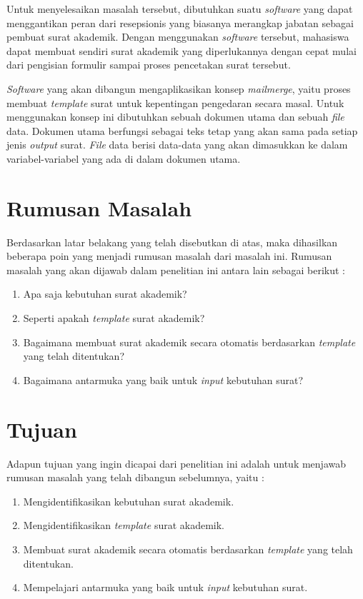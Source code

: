 Untuk menyelesaikan masalah tersebut, dibutuhkan suatu \textit{software} yang dapat menggantikan peran dari resepsionis yang biasanya merangkap jabatan sebagai pembuat surat akademik. Dengan menggunakan \textit{software} tersebut, mahasiswa dapat membuat sendiri surat akademik yang diperlukannya dengan cepat mulai dari pengisian formulir sampai proses pencetakan surat tersebut. \

\textit{Software} yang akan dibangun mengaplikasikan konsep \textit{mailmerge}, yaitu proses membuat \textit{template} surat untuk kepentingan pengedaran secara masal. Untuk menggunakan konsep ini dibutuhkan sebuah dokumen utama dan sebuah \textit{file} data. Dokumen utama berfungsi sebagai teks tetap yang akan sama pada setiap jenis \textit{output} surat. \textit{File} data berisi data-data yang akan dimasukkan ke dalam variabel-variabel yang ada di dalam dokumen utama.\

\section{Rumusan Masalah}
\label{sec:rumusan_masalah}
Berdasarkan latar belakang yang telah disebutkan di atas, maka dihasilkan beberapa poin yang menjadi rumusan masalah dari masalah ini. Rumusan masalah yang akan dijawab dalam penelitian ini antara lain sebagai berikut : 
\begin{enumerate}
	\item Apa saja kebutuhan surat akademik?
	\item Seperti apakah \textit{template} surat akademik?
	\item Bagaimana membuat surat akademik secara otomatis berdasarkan \textit{template} yang telah ditentukan?
	\item Bagaimana antarmuka yang baik untuk \textit{input} kebutuhan surat?
\end{enumerate}

\section{Tujuan}
\label{sec:tujuan}
Adapun tujuan yang ingin dicapai dari penelitian ini adalah untuk menjawab rumusan masalah yang telah dibangun sebelumnya, yaitu : 
\begin{enumerate}
	\item Mengidentifikasikan kebutuhan surat akademik.
	\item Mengidentifikasikan \textit{template} surat akademik.
	\item Membuat surat akademik secara otomatis berdasarkan \textit{template} yang telah ditentukan.
	\item Mempelajari antarmuka yang baik untuk \textit{input} kebutuhan surat.
\end{enumerate}

